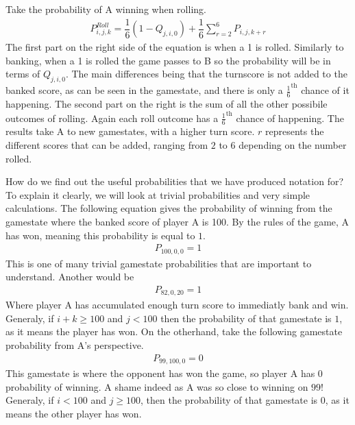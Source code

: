 \documentclass[a4paper,titlepage]{article}
\begin{document}
Take the probability of A winning when rolling.
\begin{align*}
P^{Roll}_{i,j,k} = \dfrac{1}{6} (1-Q_{j,i,0}) + \dfrac{1}{6}\sum^{6}_{r=2}P_{i,j,k+r}
\end{align*}
The first part on the right side of the equation is when a 1 is rolled. Similarly to banking, when a 1 is rolled the game passes to B so the probability will be in terms of $Q_{j,i,0}$.
The main differences being that the turnscore is not added to the banked score, as can be seen in the gamestate, and there is only a $\frac{1}{6}^\text{th}$ chance of it happening.
The second part on the right is the sum of all the other possibile outcomes of rolling. Again each roll outcome has a $\frac{1}{6}^\text{th}$ chance of happening.
The results take A to new gamestates, with a higher turn score. $r$ represents the different scores that can be added, ranging from $2$ to $6$ depending on the number rolled.

How do we find out the useful probabilities that we have produced notation for?
To explain it clearly, we will look at trivial probabilities and very simple calculations.
The following equation gives the probability of winning from the gamestate where the banked score of player A is 100. By the rules of the game, A has won, meaning this probability is equal to $1$.
\begin{align*}
	P_{100,0,0}=1
\end{align*}
This is one of many trivial gamestate probabilities that are important to understand. Another would be
\begin{align*}
	P_{82,0,20}=1
\end{align*}
Where player A has accumulated enough turn score to immediatly bank and win.
Generaly, if $i+k\geq100$ and $j<100$ then the probability of that gamestate is $1$, as it means the player has won.
On the otherhand, take the following gamestate probability from A's perspective.
\begin{align*}
	P_{99,100,0}=0
\end{align*}
This gamestate is where the opponent has won the game, so player A has 0 probability of winning. A shame indeed as A was so close to winning on $99$!
Generaly, if $i<100$ and $j\geq100$, then the probability of that gamestate is $0$, as it means the other player has won.
\end{document}
